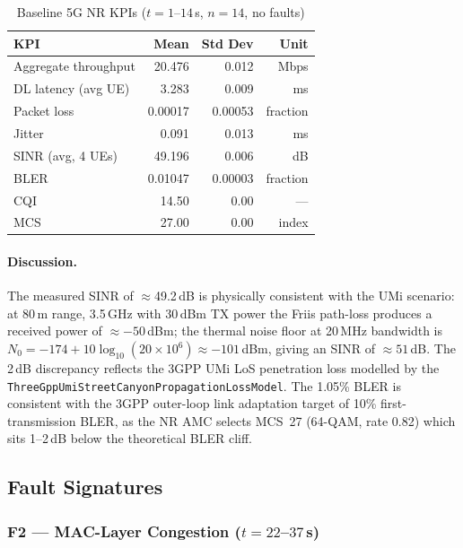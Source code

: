 \documentclass[12pt,a4paper]{article}
\begin{document}
\begin{table}[H]
\centering
\caption{Baseline 5G NR KPIs ($t = 1$--$14$\,s, $n=14$, no faults)}
\label{tab:baseline}
\begin{tabular}{lrrr}
\toprule
\textbf{KPI} & \textbf{Mean} & \textbf{Std Dev} & \textbf{Unit} \\
\midrule
Aggregate throughput  & 20.476  & 0.012 & Mbps \\
DL latency (avg UE)   & 3.283   & 0.009 & ms   \\
Packet loss           & 0.00017 & 0.00053 & fraction \\
Jitter                & 0.091   & 0.013 & ms   \\
SINR (avg, 4 UEs)     & 49.196  & 0.006 & dB   \\
BLER                  & 0.01047 & 0.00003 & fraction \\
CQI                   & 14.50   & 0.00  & ---  \\
MCS                   & 27.00   & 0.00  & index \\
\bottomrule
\end{tabular}
\end{table}

\paragraph{Discussion.}
The measured SINR of $\approx$49.2\,dB is physically consistent with the
UMi scenario: at 80\,m range, 3.5\,GHz with 30\,dBm TX power the
Friis path-loss produces a received power of $\approx -50$\,dBm; the thermal
noise floor at 20\,MHz bandwidth is
$N_0 = -174 + 10\log_{10}(20\times10^6) \approx -101$\,dBm, giving an SINR
of $\approx 51$\,dB. The 2\,dB discrepancy reflects the 3GPP UMi LoS
penetration loss modelled by the \texttt{ThreeGppUmiStreetCanyonPropagationLossModel}.
The 1.05\% BLER is consistent with the 3GPP outer-loop link adaptation target
of 10\% first-transmission BLER, as the NR AMC selects MCS~27 (64-QAM, rate
0.82) which sits 1–2\,dB below the theoretical BLER cliff.

\subsection{Fault Signatures}

\subsubsection{F2 — MAC-Layer Congestion ($t = 22$--$37$\,s)}
\end{document}
